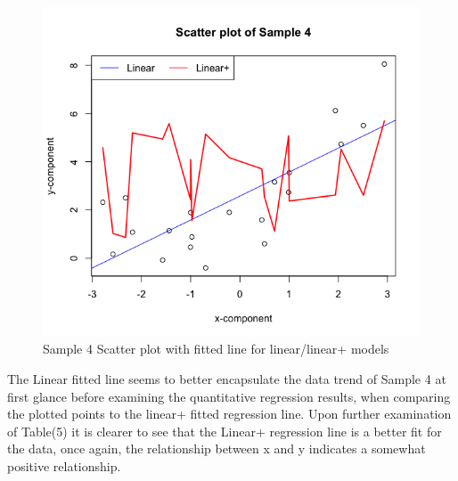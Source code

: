 \documentclass{article}
\begin{document}
\begin{figure}[!htb]
\caption{Sample 4 Scatter plot with fitted line for linear/linear+ models}
\label{returns_microsoft}
\begin{center}
\includegraphics[scale=0.8]{sample4.png}
\end{center}
\end{figure}
The Linear fitted line seems to better encapsulate the data trend of Sample 4 at first glance before examining the quantitative regression results, when comparing the plotted points to the linear+ fitted regression line. Upon further examination of Table(5) it is clearer to see that the Linear+ regression line is a better fit for the data, once again, the relationship between x and y indicates a somewhat positive relationship.
\newpage
\end{document}
